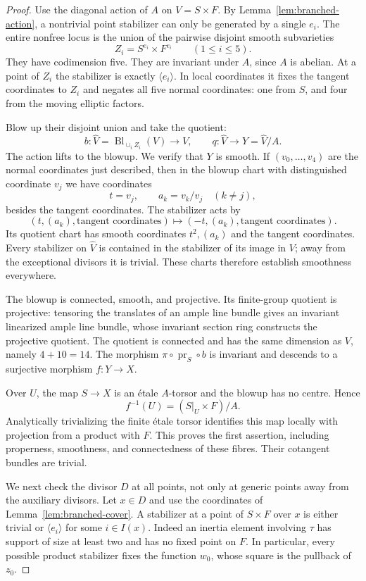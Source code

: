 \begin{proof}
Use the diagonal action of $A$ on $V=S\times F$.  By
Lemma~\ref{lem:branched-action}, a nontrivial point stabilizer can only
be generated by a single $e_i$.  The entire nonfree locus is the union
of the pairwise disjoint smooth subvarieties
\[
 Z_i=S^{e_i}\times F^{e_i}\qquad(1\leq i\leq5).
\]
They have codimension five.  They are invariant under $A$, since $A$
is abelian.  At a point of $Z_i$ the stabilizer is exactly
$\langle e_i\rangle$.  In local coordinates it fixes the tangent
coordinates to $Z_i$ and negates all five normal coordinates: one
from $S$, and four from the moving elliptic factors.

Blow up their disjoint union and take the quotient:
\[
 b:\widehat V=\operatorname{Bl}_{\cup_i Z_i}(V)\longrightarrow V,
 \qquad q:\widehat V\longrightarrow Y=\widehat V/A.
\]
The action lifts to the blowup.  We verify that $Y$ is smooth.  If
$(v_0,\ldots,v_4)$ are the normal coordinates just described, then in
the blowup chart with distinguished coordinate $v_j$ we have
coordinates
\[
 t=v_j,\qquad a_k=v_k/v_j\quad(k\ne j),
\]
besides the tangent coordinates.  The stabilizer acts by
\[
 (t,(a_k),\text{tangent coordinates})
 \longmapsto
 (-t,(a_k),\text{tangent coordinates}).
\]
Its quotient chart has smooth coordinates $t^2,(a_k)$ and the tangent
coordinates.  Every stabilizer on $\widehat V$ is contained in the
stabilizer of its image in $V$; away from the exceptional divisors it
is trivial.  These charts therefore establish smoothness everywhere.

The blowup is connected, smooth, and projective.  Its finite-group
quotient is projective: tensoring the translates of an ample line
bundle gives an invariant linearized ample line bundle, whose
invariant section ring constructs the projective quotient.  The
quotient is connected and has the same dimension as $V$, namely
$4+10=14$.  The morphism
$\pi\circ\operatorname{pr}_S\circ b$ is invariant and descends to a
surjective morphism $f:Y\to X$.

Over $U$, the map $S\to X$ is an \'etale $A$-torsor and the blowup has
no centre.  Hence
\[
 f^{-1}(U)=(S|_U\times F)/A.
\]
Analytically trivializing the finite \'etale torsor identifies this
map locally with projection from a product with $F$.  This proves the
first assertion, including properness, smoothness, and connectedness
of these fibres.  Their cotangent bundles are trivial.

We next check the divisor $D$ at all points, not only at generic
points away from the auxiliary divisors.  Let $x\in D$ and use the
coordinates of Lemma~\ref{lem:branched-cover}.  A stabilizer at a point
of $S\times F$ over $x$ is either trivial or $\langle e_i\rangle$ for
some $i\in I(x)$.  Indeed an inertia element involving $\tau$ has
support of size at least two and has no fixed point on $F$.  In
particular, every possible product stabilizer fixes the function
$w_0$, whose square is the pullback of $z_0$.


\end{proof}
